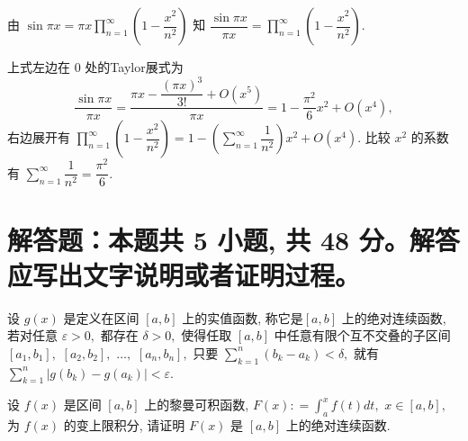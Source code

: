 \begin{solution}
由 $\sin \pi x = \pi x \prod\limits_{n=1}^{\infty} \left( 1 - \dfrac{x^2}{n^2} \right)$ 知 $\dfrac{\sin \pi x}{\pi x} = \prod\limits_{n=1}^{\infty} \left( 1 - \dfrac{x^2}{n^2} \right).$

上式左边在 $0$ 处的Taylor展式为
$$\dfrac{\sin \pi x}{\pi x} = \dfrac{\pi x - \dfrac{(\pi x)^3}{3!} + O(x^5)}{\pi x} = 1 - \dfrac{\pi^2}{6} x^2 + O(x^4), $$
右边展开有 $\prod\limits_{n=1}^{\infty} \left( 1 - \dfrac{x^2}{n^2} \right) = 1 - \left( \sum\limits_{n=1}^{\infty} \dfrac{1}{n^2} \right) x^2 + O(x^4).$ 比较 $x^2$ 的系数有 $\sum\limits_{n=1}^{\infty} \dfrac{1}{n^2} = \dfrac{\pi^2}{6}.$
\end{solution}


\section{解答题：本题共 5 小题, 共 48 分。解答应写出文字说明或者证明过程。}


\begin{question}[points = 6]
设 $g(x)$ 是定义在区间 $[a, b]$ 上的实值函数, 称它是$[a, b]$ 上的绝对连续函数, 若对任意 $\varepsilon > 0,$ 都存在 $\delta > 0,$ 使得任取 $[a, b]$ 中任意有限个互不交叠的子区间 $[a_1, b_1],$ $[a_2, b_2],$ $\dots,$ $[a_n, b_n],$ 只要 $\sum\limits_{k=1}^n (b_k - a_k) < \delta,$ 就有 $\sum\limits_{k=1}^n \lvert g(b_k) - g(a_k) \rvert < \varepsilon.$

设 $f(x)$ 是区间 $[a, b]$ 上的黎曼可积函数, $F(x) : = \int_{a}^{x} f(t) dt,$ $x \in [a, b],$ 为 $f(x)$ 的变上限积分, 请证明 $F(x)$ 是 $[a, b]$ 上的绝对连续函数.

\end{question}

